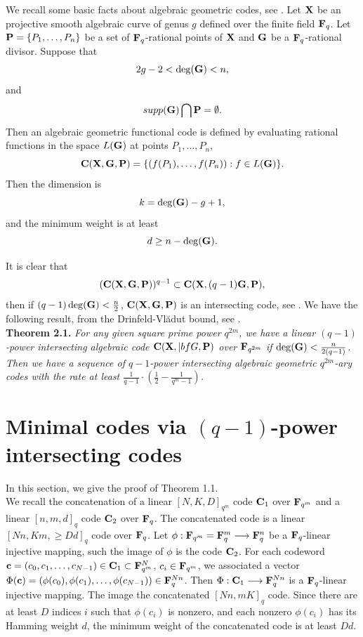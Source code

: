\documentclass[10pt,a4paper]{article}
\begin{document}
We recall some basic facts about algebraic geometric codes, see \cite{TV}. Let ${\bf X}$ be an projective smooth algebraic curve of genus $g$ defined over the finite field ${\bf F}_q$. Let ${\bf P}=\{P_1,\ldots, P_n\}$ be a set of ${\bf F}_q$-rational points of ${\bf X}$ and ${\bf G}$ be a ${\bf F}_q$-rational divisor. Suppose that $$2g-2<\deg({\bf G})<n,$$  and $$supp({\bf G}) \bigcap {\bf P}=\emptyset.$$ Then an algebraic geometric functional code is defined by evaluating rational functions in the space $L({\bf G})$ at points $P_1,\ldots, P_n$, $${\bf C}({\bf X}, {\bf G}, {\bf P})=\{(f(P_1), \ldots,f(P_n)): f \in L({\bf G})\}.$$ Then the dimension is $$k=\deg({\bf G})-g+1,$$ and the minimum weight is at least $$d \geq n-\deg({\bf G}).$$


It is clear that $$({\bf C}({\bf X}, {\bf G}, {\bf P}))^{q-1} \subset {\bf C}({\bf X}, (q-1){\bf G}, {\bf P}),$$ then if $(q-1)\deg({\bf G})<\frac{n}{2}$, ${\bf C}({\bf X}, {\bf G}, {\bf P})$ is an intersecting code, see \cite{Borello}. We have the following result, from the Drinfeld-Vl\u{a}dut bound, see \cite{TV}.\\


{\bf Theorem 2.1.} {\em For any given square prime power $q^{2m}$, we have a linear $(q-1)$-power intersecting algebraic code ${\bf C}({\bf X}, {|bf G}, {\bf P})$ over ${\bf F}_{q^{2m}}$ if $\deg({\bf G}) < \frac{n}{2(q-1)}$. Then we have a sequence of $q-1$-power intersecting algebraic geometric $q^{2m}$-ary codes with the rate at least $\frac{1}{q-1} \cdot (\frac{1}{2}-\frac{1}{q^m-1})$.}\\



\section{Minimal codes via $(q-1)$-power intersecting codes}

In this section, we give the proof of Theorem 1.1.\\


We recall the concatenation of a linear $[N, K, D]_{q^m}$ code ${\bf C}_1$ over ${\bf F}_{q^m}$ and a linear $[n, m, d]_q$ code ${\bf C}_2$ over ${\bf F}_q$. The concatenated code is a linear $[Nn,Km, \geq Dd]_q$ code over ${\bf F}_q$. Let $\phi: {\bf F}_{q^m}={\bf F}_q^m \longrightarrow {\bf F}_q^n$ be a ${\bf F}_q$-linear injective mapping, such the image of $\phi$ is the code ${\bf C}_2$. For each codeword ${\bf c}=(c_0, c_1, \ldots, c_{N-1}) \in {\bf C}_1 \subset {\bf F}_{q^m}^N$, $c_i \in {\bf F}_{q^m}$, we associated a vector $\Phi({\bf c})=(\phi(c_0), \phi(c_1), \ldots, \phi(c_{N-1})) \in {\bf F}_q^{Nn}$. Then $\Phi: {\bf C}_1 \longrightarrow {\bf F}_q^{Nn}$ is a ${\bf F}_q$-linear injective mapping. The image the concatenated $[Nn, mK]_q$ code. Since there are at least $D$ indices $i$ such that $\phi(c_i)$ is nonzero, and each nonzero $\phi(c_i)$ has its Hamming weight $d$, the minimum weight of the concatenated code is at least $Dd$.\\
\end{document}

